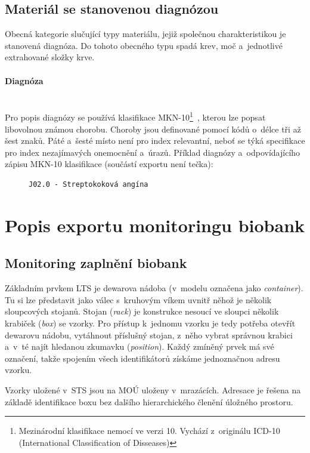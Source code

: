 \documentclass[11pt, draft, oneside]{fithesis2}
\newcommand{\paragraphNewLine}[1]{\paragraph*{#1}\mbox{}\\}
\begin{document}
\subsection{Materiál se stanovenou diagnózou}
Obecná kategorie slučující typy materiálu, jejiž společnou charakteristikou je stanovená diagnóza. Do tohoto obecného typu spadá krev, moč a~jednotlivé extrahované složky krve.

\paragraphNewLine{Diagnóza}
Pro popis diagnózy se používá klasifikace MKN-10\footnote{Mezinárodní klasifikace nemocí ve verzi 10. Vychází z~originálu ICD-10 (International Classification of Disseases)}~\cite{MKN-10}, kterou lze popsat libovolnou známou chorobu.
Choroby jsou definované pomocí kódů o~délce tři až šest znaků. Páté a~šesté místo není pro index relevantní, neboť se týká specifikace pro index nezajímavých onemocnění a~úrazů. 
Příklad diagnózy a~odpovídajícího zápisu MKN-10 klasifikace (součástí exportu není tečka):

\begin{figure}[h!]
\centering
\begin{BVerbatim}
J02.0 - Streptokoková angína
\end{BVerbatim}
\end{figure}

\section{Popis exportu monitoringu biobank}

\subsection{Monitoring zaplnění biobank}\label{chapter:analysis:subsection:monitoring}
Základním prvkem LTS je dewarova nádoba (v~modelu označena jako \textit{container}). Tu si lze představit jako válec s~kruhovým víkem uvnitř něhož je několik sloupcových stojanů. Stojan (\textit{rack}) je konstrukce nesoucí ve sloupci několik krabiček (\textit{box}) se vzorky. Pro přístup k~jednomu vzorku je tedy potřeba otevřít dewarovu nádobu, vytáhnout příslušný stojan, z~něho vybrat správnou krabici a~v~té najít hledanou zkumavku (\textit{position}). Každý zmíněný prvek má své označení, takže spojením všech identifikátorů získáme jednoznačnou adresu vzorku.

Vzorky uložené v~STS jsou na MOÚ uloženy v~mrazácích. Adresace je řešena na základě identifikace boxu bez dalšího hierarchického členění úložného prostoru.
\end{document}
